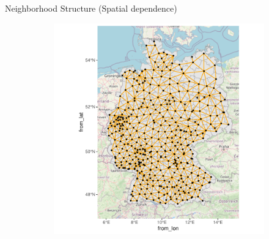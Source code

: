 \documentclass[10pt]{beamer}
\begin{document}
\begin{frame}{Neighborhood Structure (Spatial dependence)}
\begin{figure}
\begin{subfigure}[b]{1\textheight}
\includegraphics{S_E_Ampah_QRE-plot-spatial-data-neighbors}
\end{subfigure}
\end{figure}
\end{frame}
\end{document}
